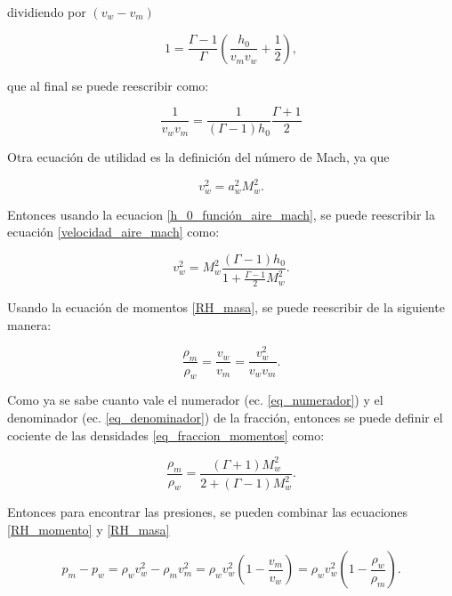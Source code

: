 \documentclass[12pt,a4paper]{book}
\begin{document}
\noindent dividiendo por $ \left( v_w - v_m \right)$

\begin{equation}
  1 = \frac{\Gamma - 1}{\Gamma} \left( \frac{h_0}{v_m v_w} + \frac{1}{2} \right),
\end{equation}

\noindent que al final se puede reescribir como:

\begin{equation} \label{eq_denominador}
  \frac{1}{v_w v_m} = \frac{1}{\left( \Gamma -1\right) h_0} \frac{\Gamma + 1}{2}
\end{equation}

Otra ecuación de utilidad es la definición del número de Mach, ya que

\begin{equation}\label{velocidad_aire_mach}
  v_w^2 = a_w^2 M_w^2.
\end{equation}

\noindent Entonces usando la ecuacion \ref{h_0_función_aire_mach}, se puede reescribir la ecuación \ref{velocidad_aire_mach}
como:

\begin{equation} \label{eq_numerador}
  v_w^2 = M_w^2 \frac{\left( \Gamma -1 \right) h_0}{1+\frac{\Gamma - 1}{2} M_w^2}.
\end{equation}

\noindent Usando la ecuación de momentos \ref{RH_masa}, se puede reescribir de la siguiente manera:

\begin{equation} \label{eq_fraccion_momentos}
  \frac{\rho_m }{\rho_w} = \frac{ v_w}{v_m} = \frac{v_w^2}{v_w v_m}.
\end{equation}

Como ya se sabe cuanto vale el numerador (ec. \ref{eq_numerador}) y el denominador (ec. \ref{eq_denominador}) de la fracción, entonces se puede definir el cociente de las densidades \ref{eq_fraccion_momentos} como:

\begin{equation}\label{eq_fraccion_momentos_funcion_mach}
  \frac{\rho_m}{\rho_w} = \frac{\left( \Gamma +1 \right) M_w^2}{2+ \left( \Gamma -1 \right) M_w^2}.
\end{equation}

\noindent Entonces para encontrar las presiones, se pueden combinar las ecuaciones \ref{RH_momento} y \ref{RH_masa} 

\begin{equation}
  p_m - p_w = \rho_w v_w^2 - \rho_m v_m^2 = \rho_w v_w^2 \left( 1 - \frac{v_m}{v_w}\right) = \rho_w v_w^2 \left( 1 - \frac{\rho_w}{\rho_m}\right).
\end{equation}
\end{document}
